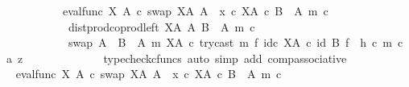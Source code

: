 \begin{isabellebody}
\ \ \ \ \ \ \ \ \ \ {\isacharequal}{\kern0pt}\ {\isacharparenleft}{\kern0pt}{\isacharparenleft}{\kern0pt}eval{\isacharunderscore}{\kern0pt}func\ X\ A\ {\isasymcirc}\isactrlsub c\ swap\ {\isacharparenleft}{\kern0pt}X\isactrlbsup A\isactrlesup {\isacharparenright}{\kern0pt}\ A{\isacharparenright}{\kern0pt}\ {\isasymamalg}\ {\isacharparenleft}{\kern0pt}x\ {\isasymcirc}\isactrlsub c\ {\isasymbeta}\isactrlbsub X\isactrlbsup A\isactrlesup \ {\isasymtimes}\isactrlsub c\ {\isacharparenleft}{\kern0pt}B\ {\isasymsetminus}\ {\isacharparenleft}{\kern0pt}A{\isacharcomma}{\kern0pt}\ m{\isacharparenright}{\kern0pt}{\isacharparenright}{\kern0pt}\isactrlesub {\isacharparenright}{\kern0pt}\ {\isasymcirc}\isactrlsub c\isanewline
\ \ \ \ \ \ \ \ \ \ \ \ dist{\isacharunderscore}{\kern0pt}prod{\isacharunderscore}{\kern0pt}coprod{\isacharunderscore}{\kern0pt}left\ {\isacharparenleft}{\kern0pt}X\isactrlbsup A\isactrlesup {\isacharparenright}{\kern0pt}\ A\ {\isacharparenleft}{\kern0pt}B\ {\isasymsetminus}\ {\isacharparenleft}{\kern0pt}A{\isacharcomma}{\kern0pt}\ m{\isacharparenright}{\kern0pt}{\isacharparenright}{\kern0pt}\ {\isasymcirc}\isactrlsub c\isanewline
\ \ \ \ \ \ \ \ \ \ \ \ swap\ {\isacharparenleft}{\kern0pt}A\ {\isasymCoprod}\ {\isacharparenleft}{\kern0pt}B\ {\isasymsetminus}\ {\isacharparenleft}{\kern0pt}A{\isacharcomma}{\kern0pt}\ m{\isacharparenright}{\kern0pt}{\isacharparenright}{\kern0pt}{\isacharparenright}{\kern0pt}\ {\isacharparenleft}{\kern0pt}X\isactrlbsup A\isactrlesup {\isacharparenright}{\kern0pt}\ {\isasymcirc}\isactrlsub c\ try{\isacharunderscore}{\kern0pt}cast\ m\ {\isasymtimes}\isactrlsub f\ id\isactrlsub c\ {\isacharparenleft}{\kern0pt}X\isactrlbsup A\isactrlesup {\isacharparenright}{\kern0pt}{\isacharparenright}{\kern0pt}\ {\isasymcirc}\isactrlsub c\ {\isacharparenleft}{\kern0pt}id\ B\ {\isasymtimes}\isactrlsub f\ \ h{\isacharparenright}{\kern0pt}\ {\isasymcirc}\isactrlsub c\ {\isasymlangle}m\ {\isasymcirc}\isactrlsub c\ a{\isacharcomma}{\kern0pt}\ z{\isasymrangle}{\isachardoublequoteclose}\isanewline
\ \ \ \ \ \ \ \ \ \ \ \ \isamarkupfalse%
\ {\isacharparenleft}{\kern0pt}typecheck{\isacharunderscore}{\kern0pt}cfuncs{\isacharcomma}{\kern0pt}\ auto\ simp\ add{\isacharcolon}{\kern0pt}\ comp{\isacharunderscore}{\kern0pt}associative{}{\isacharparenright}{\kern0pt}\isanewline
\ \ \ \ \ \ \ \ \ \ \isamarkupfalse%
\ \isamarkupfalse%
\ {\isachardoublequoteopen}{\isacharparenleft}{\kern0pt}{\isacharparenleft}{\kern0pt}eval{\isacharunderscore}{\kern0pt}func\ X\ A\ {\isasymcirc}\isactrlsub c\ swap\ {\isacharparenleft}{\kern0pt}X\isactrlbsup A\isactrlesup {\isacharparenright}{\kern0pt}\ A{\isacharparenright}{\kern0pt}\ {\isasymamalg}\ {\isacharparenleft}{\kern0pt}x\ {\isasymcirc}\isactrlsub c\ {\isasymbeta}\isactrlbsub X\isactrlbsup A\isactrlesup \ {\isasymtimes}\isactrlsub c\ {\isacharparenleft}{\kern0pt}B\ {\isasymsetminus}\ {\isacharparenleft}{\kern0pt}A{\isacharcomma}{\kern0pt}\ m{\isacharparenright}{\kern0pt}{\isacharparenright}{\kern0pt}\isactrlesub {\isacharparenright}{\kern0pt}\ {\isasymcirc}\isactrlsub c\isanewline

\end{isabellebody}
